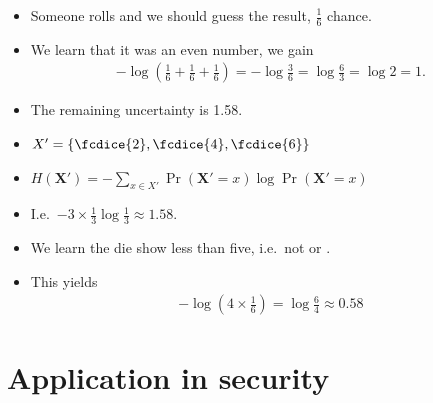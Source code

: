 \documentclass{beamer}
\let\stoch\mathbf{}
\begin{document}
\begin{frame}
  \begin{example}
    \begin{itemize}
      \item Someone rolls and we should guess the result, \(\frac{1}{6}\) 
        chance.
      \item We learn that it was an even number, we gain
        \begin{align*}
          -\log\left( \frac{1}{6} + \frac{1}{6} + \frac{1}{6}\right) =
          -\log\frac{3}{6} = \log\frac{6}{3} = \log 2 = 1.
        \end{align*}
      \item The remaining uncertainty is \SI{1.58}{\bit}.
    \end{itemize}
  \end{example}

  \pause{}

  \begin{remark}
    \begin{itemize}
      \item \(X' = \{\fcdice{2}, \fcdice{4}, \fcdice{6}\}\)
      \item \(H(\stoch X') = - \sum_{x\in X'} \Pr(\stoch X' = x)\log \Pr(\stoch 
          X' = x)\)
      \item I.e.\ \(- 3 \times \frac{1}{3}\log\frac{1}{3} \approx 1.58\).
    \end{itemize}
  \end{remark}
\end{frame}

\begin{frame}
  \begin{example}
    \begin{itemize}
      \item We learn the die show less than five, i.e.\ not  or 
        .
      \item This yields
        \begin{align*}
          -\log\left( 4\times\frac{1}{6}\right) = \log\frac{6}{4}\approx 0.58
        \end{align*}
    \end{itemize}
  \end{example}
\end{frame}


\section[Applications]{Application in security}
\end{document}
